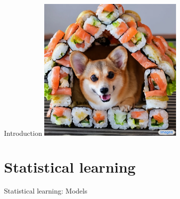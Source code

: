 \documentclass[8pt]{beamer}
\begin{document}
	\begin{frame}{Introduction} %
		\centering
		\vfill
		\includegraphics[width=7cm]{data/dog-in-sushihouse.png}
		\vfill
	\end{frame}

	\section{Statistical learning}

	\begin{frame}{Statistical learning: Models} %
		\centering
		\vfill
		\vfill
	\end{frame}
\end{document}
